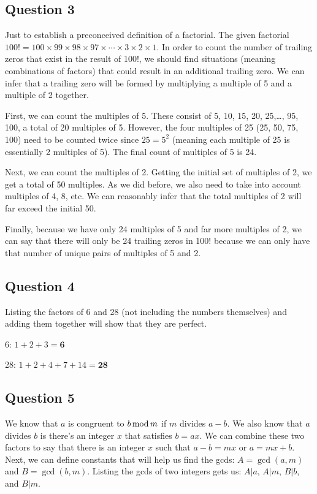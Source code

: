 \documentclass[letterpaper, 12pt]{article}
\begin{document}
\subsection*{Question 3}
Just to establish a preconceived definition of a factorial. The given factorial $100! = 100 \times 99 \times 98 \times 97 \times \cdots \times 3 \times 2 \times 1$. In order to count the number of trailing zeros that exist in the result of 100!, we should find situations (meaning combinations of factors) that could result in an additional trailing zero. We can infer that a trailing zero will be formed by multiplying a multiple of 5 and a multiple of 2 together.

First, we can count the multiples of 5. These consist of 5, 10, 15, 20, 25,\ldots, 95, 100, a total of 20 multiples of 5. However, the four multiples of 25 (25, 50, 75, 100) need to be counted twice since $25=5^2$ (meaning each multiple of 25 is essentially 2 multiples of 5). The final count of multiples of 5 is 24.

Next, we can count the multiples of 2. Getting the initial set of multiples of 2, we get a total of 50 multiples. As we did before, we also need to take into account multiples of 4, 8, etc. We can reasonably infer that the total multiples of 2 will far exceed the initial 50.

Finally, because we have only 24 multiples of 5 and far more multiples of 2, we can say that there will only be 24 trailing zeros in 100! because we can only have that number of unique pairs of multiples of 5 and 2.

\subsection*{Question 4}
Listing the factors of 6 and 28 (not including the numbers themselves) and adding them together will show that they are perfect.

6: $1+2+3=\textbf{6}$

28: $1+2+4+7+14=\textbf{28}$

\subsection*{Question 5}
We know that $a$ is congruent to $b \mathinner{\text{mod}} m$ if $m$ divides $a-b$. We also know that $a$ divides $b$ is there's an integer $x$ that satisfies $b = ax$. We can combine these two factors to say that there is an integer $x$ such that $a - b = mx$ or $a = mx + b$. Next, we can define constants that will help us find the gcds: $A = \gcd(a, m)$ and $B = \gcd(b,m)$. Listing the gcds of two integers gets us: $A|a$, $A|m$, $B|b$, and $B|m$.
\end{document}

